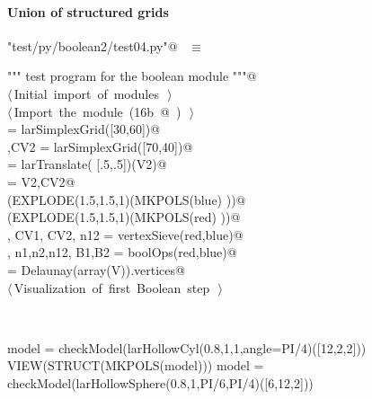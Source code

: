 \documentclass[11pt,oneside]{article}	%
\begin{document}
\paragraph{Union of structured grids}

\begin{flushleft} \small
\begin{minipage}{\linewidth} \label{scrap34}
\verb@"test/py/boolean2/test04.py"@\nobreak\ {\footnotesize {} }$\equiv$
\vspace{-1ex}
\begin{list}{}{} \item
\mbox{}\verb@""" test program for the boolean module """@\\
\mbox{}\verb@@\hbox{$\langle\,$Initial import of modules\nobreak\ {\footnotesize {}}$\,\rangle$}\verb@@\\
\mbox{}\verb@@\hbox{$\langle\,$Import the module\nobreak\ ({\footnotesize 16b\label{scrap35}
 }\mbox{}@ ) {\footnotesize {}}$\,\rangle$}\verb@@\\
\mbox{}\verb@blue = larSimplexGrid([30,60])@\\
\mbox{},CV2 = larSimplexGrid([70,40])@\\
\mbox{} = larTranslate( [.5,.5])(V2)@\\
\mbox{}\verb@red = V2,CV2@\\
\mbox{}\verb@VIEW(EXPLODE(1.5,1.5,1)(MKPOLS(blue) ))@\\
\mbox{}\verb@VIEW(EXPLODE(1.5,1.5,1)(MKPOLS(red) ))@\\
\mbox{}\verb@V, CV1, CV2, n12 = vertexSieve(red,blue)@\\
\mbox{}\verb@V, n1,n2,n12, B1,B2 = boolOps(red,blue)@\\
\mbox{}\verb@CV = Delaunay(array(V)).vertices@\\
\mbox{}\verb@@\hbox{$\langle\,$Visualization of first Boolean step\nobreak\ {\footnotesize {}}$\,\rangle$}\verb@@\\
\mbox{}\verb@@{\NWsep}
\end{list}
\vspace{-2ex}
\end{minipage}\\[4ex]
\end{flushleft}


model = checkModel(larHollowCyl(0.8,1,1,angle=PI/4)([12,2,2]))
VIEW(STRUCT(MKPOLS(model)))
model = checkModel(larHollowSphere(0.8,1,PI/6,PI/4)([6,12,2]))
\end{document}
